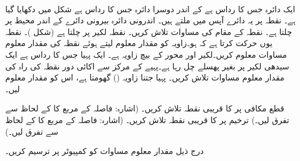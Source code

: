 \\
ایک دائرہ جس کا رداس  ہے کے اندر دوسرا دائرہ جس کا رداس  ہے شکل  میں دکھایا گیا ہے۔ نقطہ  پر یہ دائرے آپس میں ملتے ہیں۔ اندرونی دائرہ بیرونی دائرے کے اندر محیط پر چلتا ہے۔ نقطہ  کے مقام کی مساوات تلاش کریں۔
نقطہ  لکیر  پر چلتا ہے (شکل )۔ نقطہ  یوں حرکت کرتا ہے کہ  ہو۔زاویہ  کو مقدار معلوم لیتے ہوئے نقطہ  کی مقدار معلوم مساوات معلوم کریں۔لکیر  اور  محور کے بیچ زاویہ  ہے۔
ایک پہیا جس کا رداس  ہے ایک سیدھی لکیر پر بغیر پھسلے چل رہا ہے۔پہیے کے مرکز سے  اکائی دور نقطہ  کی راہ کی مقدار معلوم مساوات تلاش کریں۔ پہیا جتنا زاویہ () گھومتا ہے، اس کو مقدار معلوم لیں۔   


قطع مکافی  پر  کا قریبی نقطہ تلاش کریں۔ (اشارہ: فاصلہ کے مربع کا  کے لحاظ سے تفرق لیں۔)
ترخیم  پر  کا قریبی نقطہ تلاش کریں۔  (اشارہ: فاصلہ کے مربع کا  کے لحاظ سے تفرق لیں۔)


درج ذیل مقدار معلوم مساوات کو کمپیوٹر پر ترسیم کریں۔

